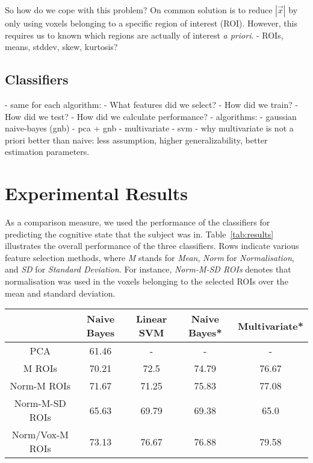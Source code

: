 \documentclass[preprint,journal,11pt]{vgtc}
\begin{document}
So how do we cope with this problem? On common solution is to reduce $|\vec{x}|$ by only using voxels belonging to a specific region of interest (ROI). However, this requires us to known which regions are actually of interest \textit{a priori}.
- ROIs, means, stddev, skew, kurtosis?

\subsection{Classifiers}



- same for each algorithm:
    - What features did we select?
    - How did we train?
    - How did we test?
        - How did we calculate performance?
- algorithms:
    - gaussian naive-bayes (gnb)
        - pca + gnb
    - multivariate
    - svm
    - why multivariate is not a priori better than naive: less assumption, higher generalizability, better estimation parameters. 



\section{Experimental Results}
\label{sec:results}

As a comparison measure, we used the performance of the classifiers for predicting the cognitive state that the subject was in. Table~\ref{tab:results} illustrates the overall performance of the three classifiers. Rows indicate various feature selection methods, where \emph{M} stands for \emph{Mean}, \emph{Norm} for \emph{Normalisation}, and \emph{SD} for \emph{Standard Deviation}. For instance, \emph{Norm-M-SD ROIs} denotes that normalisation was used in the voxels belonging to the selected ROIs over the mean and standard deviation.

\begin{table*}[htpb]
\centering
{\small
\begin{tabular}{c|c|c|c|c}
& \textbf{Naive Bayes} & \textbf{Linear SVM} & \textbf{Naive Bayes*} & \textbf{Multivariate*} \\ \hline
PCA & 61.46 &  - & - & - \\
M ROIs & 70.21 & 72.5 & 74.79 & 76.67 \\
Norm-M ROIs & 71.67 & 71.25 & 75.83 & 77.08 \\
Norm-M-SD ROIs & 65.63 & 69.79 & 69.38 & 65.0 \\
Norm/Vox-M ROIs & 73.13 & 76.67 & 76.88 & 79.58 \\
\end{tabular}}
\caption{Performance results (in \%) of the three classifiers on different methods for feature selection and structure.}
\label{tab:results}
\end{table*}
\end{document}
